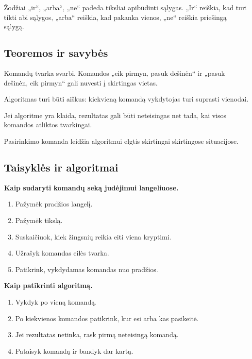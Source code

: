 \begin{apibreztis}
Žodžiai „ir“, „arba“, „ne“ padeda tiksliai apibūdinti sąlygas. „Ir“ reiškia, kad turi tikti abi sąlygos, „arba“ reiškia, kad pakanka vienos, „ne“ reiškia priešingą sąlygą.
\end{apibreztis}

\subsection{Teoremos ir savybės}

\begin{savybe}
Komandų tvarka svarbi. Komandos „eik pirmyn, pasuk dešinėn“ ir „pasuk dešinėn, eik pirmyn“ gali nuvesti į skirtingas vietas.
\end{savybe}

\begin{savybe}
Algoritmas turi būti aiškus: kiekvieną komandą vykdytojas turi suprasti vienodai.
\end{savybe}

\begin{savybe}
Jei algoritme yra klaida, rezultatas gali būti neteisingas net tada, kai visos komandos atliktos tvarkingai.
\end{savybe}

\begin{savybe}
Pasirinkimo komanda leidžia algoritmui elgtis skirtingai skirtingose situacijose.
\end{savybe}

\subsection{Taisyklės ir algoritmai}

\textbf{Kaip sudaryti komandų seką judėjimui langeliuose.}
\begin{enumerate}
\item Pažymėk pradžios langelį.
\item Pažymėk tikslą.
\item Suskaičiuok, kiek žingsnių reikia eiti viena kryptimi.
\item Užrašyk komandas eilės tvarka.
\item Patikrink, vykdydamas komandas nuo pradžios.
\end{enumerate}

\textbf{Kaip patikrinti algoritmą.}
\begin{enumerate}
\item Vykdyk po vieną komandą.
\item Po kiekvienos komandos patikrink, kur esi arba kas pasikeitė.
\item Jei rezultatas netinka, rask pirmą neteisingą komandą.
\item Pataisyk komandą ir bandyk dar kartą.
\end{enumerate}

